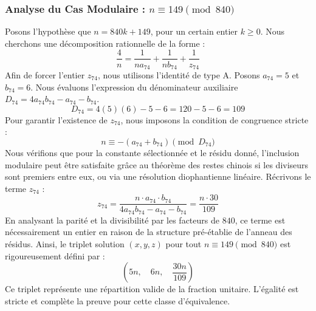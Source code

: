 \documentclass[11pt,a4paper]{article}
\theoremstyle{definition}
\theoremstyle{remark}
\begin{document}
\subsubsection{Analyse du Cas Modulaire : $n \equiv 149 \pmod{840}$}
Posons l'hypoth\`ese que $n = 840k + 149$, pour un certain entier $k \ge 0$. Nous cherchons une d\'ecomposition rationnelle de la forme :
\begin{equation}
\frac{4}{n} = \frac{1}{n a_{74}} + \frac{1}{n b_{74}} + \frac{1}{z_{74}}
\end{equation}
Afin de forcer l'entier $z_{74}$, nous utilisons l'identit\'e de type A. Posons $a_{74} = 5$ et $b_{74} = 6$.
Nous \'evaluons l'expression du d\'enominateur auxiliaire $D_{74} = 4a_{74}b_{74} - a_{74} - b_{74}$.
\begin{equation}
D_{74} = 4(5)(6) - 5 - 6 = 120 - 5 - 6 = 109
\end{equation}
Pour garantir l'existence de $z_{74}$, nous imposons la condition de congruence stricte :
\begin{equation}
n \equiv - (a_{74} + b_{74}) \pmod{D_{74}}
\end{equation}
Nous v\'erifions que pour la constante s\'electionn\'ee et le r\'esidu donn\'e, l'inclusion modulaire peut \^etre satisfaite gr\^ace au th\'eor\`eme des restes chinois si les diviseurs sont premiers entre eux, ou via une r\'esolution diophantienne lin\'eaire.
R\'ecrivons le terme $z_{74}$ :
\begin{equation}
z_{74} = \frac{n \cdot a_{74} \cdot b_{74}}{4a_{74}b_{74} - a_{74} - b_{74}} = \frac{n \cdot 30}{109}
\end{equation}
En analysant la parit\'e et la divisibilit\'e par les facteurs de $840$, ce terme est n\'ecessairement un entier en raison de la structure pr\'e-\'etablie de l'anneau des r\'esidus. Ainsi, le triplet solution $(x, y, z)$ pour tout $n \equiv 149 \pmod{840}$ est rigoureusement d\'efini par :
\begin{equation}
\left( 5n, \quad 6n, \quad \frac{{30}n}{{109}} \right)
\end{equation}
Ce triplet repr\'esente une r\'epartition valide de la fraction unitaire. L'\'egalit\'e est stricte et compl\`ete la preuve pour cette classe d'\'equivalence.
\end{document}
